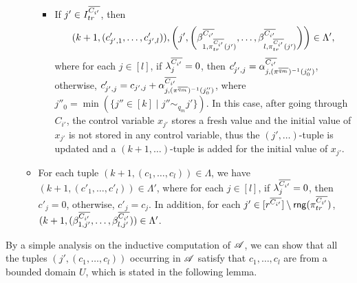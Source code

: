 \begin{enumerate}
\begin{itemize}
\begin{itemize}
\begin{itemize}
\end{itemize}
%
\item If $j' \in I^{\overline{C_{i'}}}_{tr}$, then 
$$(k+1, (c'_{j', 1}, \dots, c'_{j', l})), \left(j', \left(\beta^{\overline{C_{i'}}}_{1, \pi^{\overline{C_{i'}}}_{tr}(j')}, \dots, \beta^{\overline{C_{i'}}}_{l, \pi^{\overline{C_{i'}}}_{tr}(j')} \right) \right) \in \Lambda',$$ 
where for each $j \in [l]$, if $\lambda^{\overline{C_{i'}}}_j = 0$, then $c'_{j', j}= \alpha^{\overline{C_{i'}}}_{j, (\pi^{\overline{q_m}})^{-1}(j''_0)}$,  otherwise, $c'_{j', j} = c_{j',j} +   \alpha^{\overline{C_{i'}}}_{j, (\pi^{\overline{q_m}})^{-1}(j''_0)}$, where $j''_0 = \min(\{j'' \in [k] \mid j'' \sim_{q_m} j' \})$. In this case, after going through $C_{i'}$, the control variable $x_{j'}$ stores a fresh value and the initial value of $x_{j'}$ is not stored in any control variable, thus the $(j',\dots)$-tuple is updated and a $(k+1,\dots)$-tuple is added for the initial value of $x_{j'}$.
%
\end{itemize}

\item For each tuple $(k+1, (c_1, \dots, c_l)) \in \Lambda$, we have $(k+1, (c'_1, \dots, c'_l)) \in \Lambda'$, where for each $j \in [l]$, if $\lambda^{\overline{C_{i'}}}_j = 0$, then $c'_{j}= 0$, otherwise, $c'_{j} = c_j$. In addition, for each $j' \in [r^{\overline{C_{i'}}}] \setminus \mathsf{rng}(\pi^{\overline{C_{i'}}}_{tr})$, $(k+1, (\beta^{\overline{C_{i'}}}_{1, j'}, \dots, \beta^{\overline{C_{i'}}}_{l, j'})) \in \Lambda'$. 
\end{itemize}
\end{enumerate}


By a simple analysis on the inductive computation of $\mathscr{A}$, we can show that all the tuples $(j', (c_1, \dots, c_l))$ occurring in $\mathscr{A}$ satisfy that $c_1,\dots, c_l$ are from a bounded domain $U$, which is stated in the following lemma.

